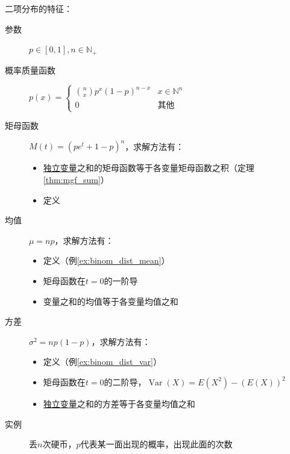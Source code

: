 二项分布的特征：
\begin{description}
    \item[参数] $p \in [0,1], n \in \mathbb{N}_+$
    \item[概率质量函数] $p(x)=\begin{cases}
                \binom{n}{x} p^x (1-p)^{n-x} & x \in \mathbb{N}^n \\
                0                            & \text{其他}
            \end{cases}$
    \item[矩母函数] $M(t)=(p e^t + 1-p)^n$，求解方法有：
        \begin{itemize}
            \item \underline{独立变量}之和的矩母函数等于各变量矩母函数之积（定理\ref{thm:mgf_sum}）
            \item 定义
        \end{itemize}
    \item[均值] $\mu=np$，求解方法有：
        \begin{itemize}
            \item 定义（例\ref{ex:binom_dist_mean}）
            \item 矩母函数在$t=0$的一阶导
            \item 变量之和的均值等于各变量均值之和
        \end{itemize}
    \item[方差] $\sigma^2=np(1-p)$，求解方法有：
        \begin{itemize}
            \item 定义（例\ref{ex:binom_dist_var}）
            \item 矩母函数在$t=0$的二阶导，$\operatorname{Var}(X)=E(X^2)-(E(X))^2$
            \item \underline{独立变量}之和的方差等于各变量均值之和
        \end{itemize}
    \item[实例] 丢$n$次硬币，$p$代表某一面出现的概率，出现此面的次数
\end{description}

